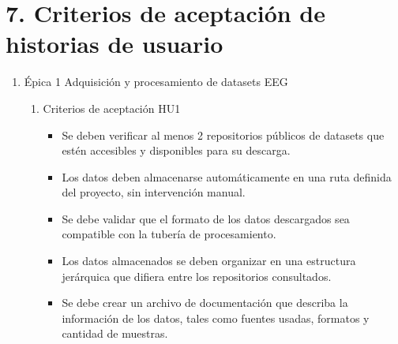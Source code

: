 \documentclass[
11pt, %
]{charter}
\begin{document}
\section{7. Criterios de aceptación de historias de usuario}
\label{sec:criteriosAceptacion}
\begin{enumerate}
	\item Épica 1 Adquisición y procesamiento de datasets EEG

	\begin{enumerate}
		\item Criterios de aceptación HU1
			\begin{itemize}
				\item Se deben verificar al menos 2 repositorios públicos de datasets que estén accesibles y disponibles para su descarga.
				\item Los datos deben almacenarse automáticamente en una ruta definida del proyecto, sin intervención manual.
				\item Se debe validar que el formato de los datos descargados sea compatible con la tubería de procesamiento.
				\item Los datos almacenados se deben organizar en una estructura jerárquica que difiera entre los repositorios consultados.
				\item Se debe crear un archivo de documentación que describa la información de los datos, tales como fuentes usadas, formatos y cantidad de muestras.
			\end{itemize}
			  

\end{enumerate}
\end{enumerate}
\end{document}
